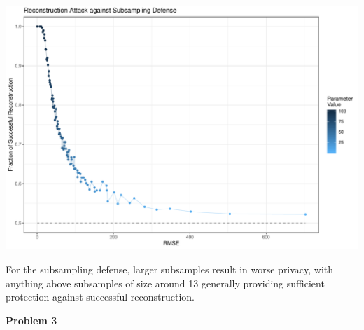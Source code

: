 \documentclass[12pt]{article}
\begin{document}
\begin{center}
\includegraphics[width=\textwidth]{figs/attacksubsampling}
\end{center}
For the subsampling defense, larger subsamples result in worse privacy, with anything above subsamples of size around 13 generally providing sufficient protection against successful reconstruction.
\pagebreak

{\large\textbf{Problem 3}}
\end{document}
